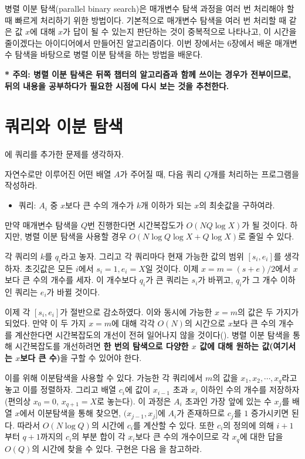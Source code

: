 병렬 이분 탐색(parallel binary search)은 매개변수 탐색 과정을 여러 번 처리해야 할 때 빠르게 처리하기 위한 방법이다. 기본적으로 매개변수 탐색을 여러 번 처리할 때 같은 값 $x$에 대해 $x$가 답이 될 수 있는지 판단하는 것이 중복적으로 나타나고, 이 시간을 줄이겠다는 아이디어에서 만들어진 알고리즘이다. 이번 장에서는 6장에서 배운 매개변수 탐색을 바탕으로 병렬 이분 탐색을 하는 방법을 배운다.

\textbf{* 주의: 병렬 이분 탐색은 뒤쪽 챕터의 알고리즘과 함께 쓰이는 경우가 전부이므로, 뒤의 내용을 공부하다가 필요한 시점에 다시 보는 것을 추천한다.}

\section{쿼리와 이분 탐색}
에 쿼리를 추가한 문제를 생각하자.
\begin{example} \label{ex: parallel-binary-search}
    자연수로만 이루어진 어떤 배열 $A$가 주어질 때, 다음 쿼리 $Q$개를 처리하는 프로그램을 작성하라.
    \begin{itemize}
        \item 쿼리: $A_i$ 중 $x$보다 큰 수의 개수가 $k$개 이하가 되는 $x$의 최솟값을 구하여라.
    \end{itemize}
\end{example}

만약 매개변수 탐색을 $Q$번 진행한다면 시간복잡도가 $O(NQ\log X)$가 될 것이다. 하지만, 병렬 이분 탐색을 사용할 경우 $O(N \log Q \log X + Q \log X)$로 줄일 수 있다.

각 쿼리의 $k$를 $q_i$라고 놓자. 그리고 각 쿼리마다 현재 가능한 값의 범위 $[s_i, e_i]$를 생각하자. 초깃값은 모든 $i$에서 $s_i=1, e_i=X$일 것이다. 이제 $x=m = (s+e)/2$에서 $x$보다 큰 수의 개수를 세자. 이 개수보다 $q_i$가 큰 쿼리는 $s_i$가 바뀌고, $q_i$가 그 개수 이하인 쿼리는 $e_i$가 바뀔 것이다.

이제 각 $[s_i, e_i]$가 절반으로 감소하였다. 이와 동시에 가능한 $x=m$의 값은 두 가지가 되었다. 만약 이 두 가지 $x=m$에 대해 각각 $O(N)$의 시간으로 $x$보다 큰 수의 개수를 계산한다면 시간복잡도의 개선이 전혀 일어나지 않을 것이다(). 병렬 이분 탐색을 통해 시간복잡도를 개선하려면 \textbf{한 번의 탐색으로 다양한 $x$ 값에 대해 원하는 값(여기서는 $x$보다 큰 수)}을 구할 수 있어야 한다.

이를 위해 이분탐색을 사용할 수 있다. 가능한 각 쿼리에서 $m$의 값을 $x_1, x_2, \cdots, x_q$라고 놓고 이를 정렬하자. 그리고 배열 $c_i$에 값이 $x_{i-1}$ 초과 $x_i$ 이하인 수의 개수를 저장하자(편의상 $x_0=0$, $x_{q+1}=X$로 놓는다). 이 과정은 $A_i$ 초과인 가장 앞에 있는 수 $x_j$를 배열 $x$에서 이분탐색을 통해 찾으면, $(x_{j-1}, x_j]$에 $A_i$가 존재하므로 $c_j$를 $1$ 증가시키면 된다. 따라서 $O(N \log Q)$의 시간에 $c_i$를 계산할 수 있다. 또한 $c_i$의 정의에 의해 $i+1$부터 $q+1$까지의 $c_i$의 부분 합이 각 $x_i$보다 큰 수의 개수이므로 각 $x_q$에 대한 답을 $O(Q)$의 시간에 찾을 수 있다. 구현은 다음 을 참고하라.

